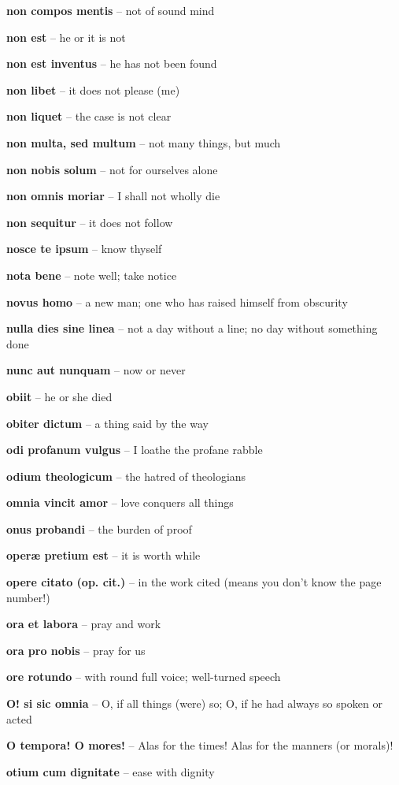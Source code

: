 \documentclass[12pt]{article}
\newcommand{\lat}[1]{\textbf{#1}}
\begin{document}
\lat{non compos mentis} -- not of sound mind

\lat{non est} -- he or it is not

\lat{non est inventus} -- he has not been found

\lat{non libet} -- it does not please (me)

\lat{non liquet} -- the case is not clear

\lat{non multa, sed multum} -- not many things, but much

\lat{non nobis solum} -- not for ourselves alone

\lat{non omnis moriar} -- I shall not wholly die

\lat{non sequitur} -- it does not follow

\lat{nosce te ipsum} -- know thyself

\lat{nota bene} -- note well; take notice

\lat{novus homo} -- a new man; one who has raised himself from obscurity

\lat{nulla dies sine linea} -- not a day without a line; no day without something done

\lat{nunc aut nunquam} -- now or never

\lat{obiit} -- he or she died

\lat{obiter dictum} -- a thing said by the way

\lat{odi profanum vulgus} -- I loathe the profane rabble

\lat{odium theologicum} -- the hatred of theologians

\lat{omnia vincit amor} -- love conquers all things

\lat{onus probandi} -- the burden of proof

\lat{oper\ae{} pretium est} -- it is worth while

\lat{opere citato (op. cit.)} -- in the work cited (means you don't know the page number!)

\lat{ora et labora} -- pray and work

\lat{ora pro nobis} -- pray for us

\lat{ore rotundo} -- with round full voice; well-turned speech

\lat{O! si sic omnia} -- O, if all things (were) so; O, if he had always so spoken or acted

\lat{O tempora! O mores!} -- Alas for the times!  Alas for the manners (or morals)!

\lat{otium cum dignitate} -- ease with dignity
\end{document}
